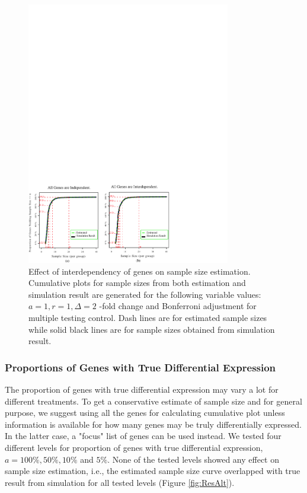 \documentclass{bioinfo}
\begin{document}
\begin{figure}[h]
    \centerline{\includegraphics*[width=3.5in]{ResDepF.pdf}}
    \caption[Effect of interdependency of genes on sample size estimation]
    {Effect of interdependency of genes on sample size estimation.
    Cumulative plots for sample sizes from both estimation and simulation result
    are generated for the following variable values: $a = 1, r = 1, \Delta = 2$ -fold change
    and Bonferroni adjustment for multiple testing control. Dash lines are for estimated sample sizes
    while solid black lines are for sample sizes obtained from simulation result.}
    \label{fig:ResDep}
\end{figure}

\subsubsection{Proportions of Genes with True Differential Expression}
The proportion of genes with true differential expression may vary
a lot for different treatments. To get a conservative estimate of
sample size and for general purpose, we suggest using all the
genes for calculating cumulative plot unless information is
available for how many genes may be truly differentially
expressed. In the latter case, a "focus" list of genes can be used
instead. We tested four different levels for proportion of genes
with true differential expression, $a = 100\%, 50\%, 10\%$ and
$5\%$. None of the tested levels showed any effect on sample size
estimation, i.e., the estimated sample size curve overlapped with
true result from simulation for all tested levels (Figure
\ref{fig:ResAlt}).
\end{document}
